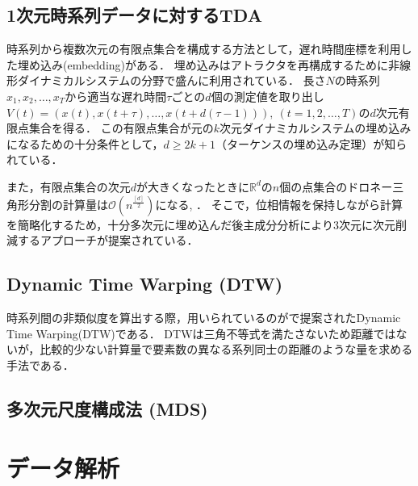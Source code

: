 \documentclass{jarticle}
\begin{document}
\subsection{1次元時系列データに対するTDA}
時系列から複数次元の有限点集合を構成する方法として，遅れ時間座標を利用した埋め込み(embedding)がある．
埋め込みはアトラクタを再構成するために非線形ダイナミカルシステムの分野で盛んに利用されている．
長さ$N$の時系列$x_1, x_2, \dots , x_T$から適当な遅れ時間$\tau$ごとの$d$個の測定値を取り出し$V(t) = (x(t), x(t+\tau), \dots, x(t + d(\tau- 1))),\ (t = 1,2,\dots, T)$の$d$次元有限点集合を得る．
この有限点集合が元の$k$次元ダイナミカルシステムの埋め込みになるための十分条件として，$d\geq 2k+1$（ターケンスの埋め込み定理\cite{Takens1981}）が知られている．

また，有限点集合の次元$d$が大きくなったときに$\mathbb R^d$の$n$個の点集合のドロネー三角形分割の計算量は$\mathcal O(n^{\frac{[d]}{2}})$になる\cite{Amenta2007}, \cite{Attali2003}．
そこで，位相情報を保持しながら計算を簡略化するため，十分多次元に埋め込んだ後主成分分析により3次元に次元削減するアプローチが提案されている\cite{Truong2017}．


\subsection{Dynamic Time Warping (DTW)}
時系列間の非類似度を算出する際，用いられているのが\cite{Berndt1996}で提案されたDynamic Time Warping(DTW)である．
DTWは三角不等式を満たさないため距離ではないが，比較的少ない計算量で要素数の異なる系列同士の距離のような量を求める手法である．



\subsection{多次元尺度構成法 (MDS)}







\section{データ解析}
\end{document}
